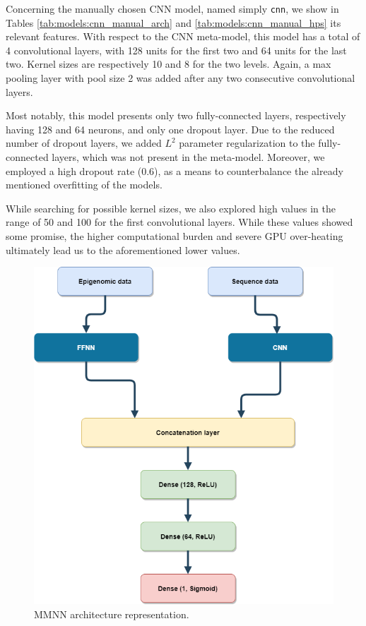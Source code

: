 \documentclass{article}
\begin{document}
Concerning the manually chosen CNN model, named simply \texttt{cnn}, we show in Tables \ref{tab:models:cnn_manual_arch} and \ref{tab:models:cnn_manual_hps} its relevant features. With respect to the CNN meta-model, this model has a total of 4 convolutional layers, with 128 units for the first two and 64 units for the last two. Kernel sizes are respectively 10 and 8 for the two levels. Again, a max pooling layer with pool size 2 was added after any two consecutive convolutional layers.

Most notably, this model presents only two fully-connected layers, respectively having 128 and 64 neurons, and only one dropout layer. Due to the reduced number of dropout layers, we added $L^2$ parameter regularization to the fully-connected layers, which was not present in the meta-model. Moreover, we employed a high dropout rate (0.6), as a means to counterbalance the already mentioned overfitting of the models.

While searching for possible kernel sizes, we also explored high values in the range of 50 and 100 for the first convolutional layers. While these values showed some promise, the higher computational burden and severe GPU over-heating ultimately lead us to the aforementioned lower values. 

\begin{figure}
    \centering
    \includegraphics[width=\textwidth]{img/mmnn.png}
    \caption{MMNN architecture representation.}
    \label{fig:models:mmnn}
\end{figure}
\end{document}

